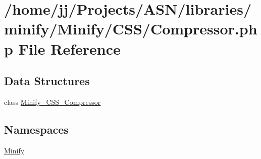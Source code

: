 \hypertarget{_compressor_8php}{}\section{/home/jj/\+Projects/\+A\+S\+N/libraries/minify/\+Minify/\+C\+S\+S/\+Compressor.php File Reference}
\label{_compressor_8php}
\subsection*{Data Structures}
\begin{DoxyCompactItemize}
\item 
class \hyperlink{class_minify___c_s_s___compressor}{Minify\+\_\+\+C\+S\+S\+\_\+\+Compressor}
\end{DoxyCompactItemize}
\subsection*{Namespaces}
\begin{DoxyCompactItemize}
\item 
 \hyperlink{namespace_minify}{Minify}
\end{DoxyCompactItemize}

